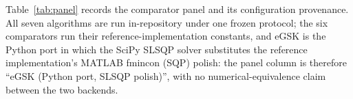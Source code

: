 \begingroup
\let\phviiiTableB\table
\let\phviiiEndTableB\endtable
\renewenvironment{table}[1][t]{\phviiiTableB[H]}{\phviiiEndTableB}

\endgroup

Table~\ref{tab:panel} records the comparator panel and its
configuration provenance.
All seven algorithms are run in-repository under one frozen protocol;
the six comparators run their reference-implementation constants, and eGSK
is the Python port in which the SciPy SLSQP solver substitutes the
reference implementation's MATLAB fmincon (SQP) polish: the panel column is
therefore ``eGSK (Python port, SLSQP polish)'', with no
numerical-equivalence claim between the two
backends. %

